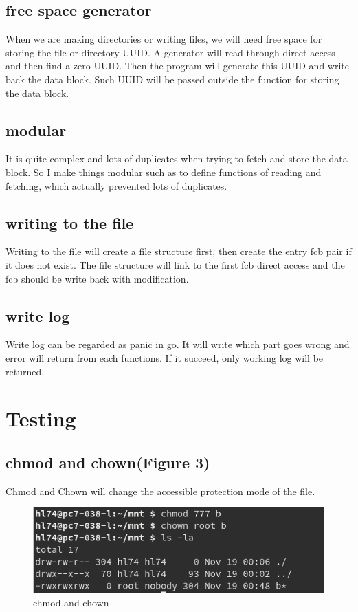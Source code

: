 \documentclass[legalpaper]{article}
\begin{document}
	\subsection*{free space generator}
	When we are making directories or writing files, we will need free space for storing the file or directory UUID. A generator will read through direct access and then find a zero UUID. Then the program will generate this UUID and write back the data block. Such UUID will be passed outside the function for storing the data block. 
	\subsection*{modular}
	It is quite complex and lots of duplicates when trying to fetch and store the data block. So I make things modular such as to define functions of reading and fetching, which actually prevented lots of duplicates.
	\subsection*{writing to the file}
	Writing to the file will create a file structure first, then create the entry fcb pair if it does not exist. The file structure will link to the first fcb direct access and the fcb should be write back with modification. 
	\subsection*{write log}
	Write log can be regarded as panic in go. It will write which part goes wrong and error will return from each functions. If it succeed, only working log will be returned.
	\section{Testing}
	\subsection*{chmod and chown(Figure 3)}
	Chmod and Chown will change the accessible protection mode of the file.
	\begin{figure}[H]
	\centering
	\includegraphics[width = \textwidth]{ch}
	\caption{chmod and chown}
	\end{figure}
\end{document}
